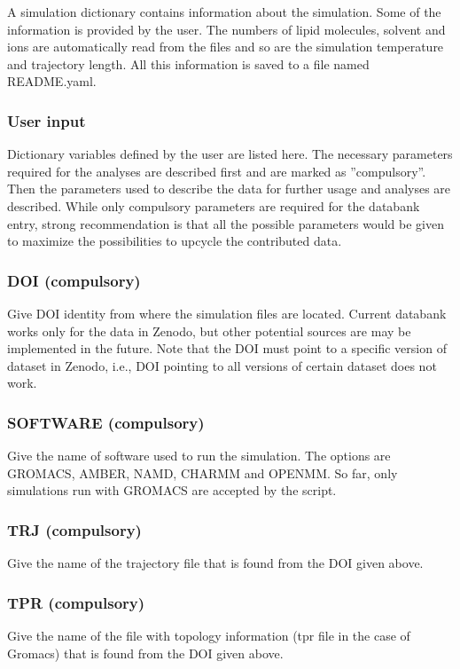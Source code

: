 \documentclass[fleqn,10pt]{wlscirep}
\begin{document}
A simulation dictionary contains information about the simulation. Some of the information is provided by the user. The numbers of lipid molecules, solvent and ions are automatically read from the files and so are the simulation temperature and trajectory length. All this information is saved to a file named README.yaml.


\subsubsection{User input}
Dictionary variables defined by the user are listed here. 
The necessary parameters required for the analyses are described first and are marked as ''compulsory''. Then the parameters used to describe the data for further usage and analyses are described.
While only compulsory parameters are required for the databank entry, strong recommendation is that all the possible parameters would be given to maximize the possibilities to upcycle the contributed data. 

\subsubsection*{DOI (compulsory)}
Give DOI identity from where the simulation files are located. Current databank works only for the data in Zenodo, but other potential sources are may be implemented in the future. Note that the DOI must point to a specific version of dataset in Zenodo, i.e., DOI pointing to all versions of certain dataset does not work.

\subsubsection*{SOFTWARE (compulsory)}
Give the name of software used to run the simulation. The options are GROMACS, AMBER, NAMD, CHARMM and OPENMM. So far, only simulations run with GROMACS are accepted by the script.

\subsubsection*{TRJ (compulsory)}
Give the name of the trajectory file that is found from the DOI given above.

\subsubsection*{TPR (compulsory)}
Give the name of the file with topology information (tpr file in the case of Gromacs) that is found from the DOI given above.
\end{document}
